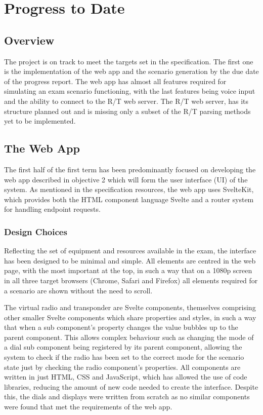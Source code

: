 \section{Progress to Date}
\label{sec:progress}

\subsection{Overview}
The project is on track to meet the targets set in the specification. The first one is the implementation of the web app and the scenario generation by the due date of the progress report. The web app has almost all features required for simulating an exam scenario functioning, with the last features being voice input and the ability to connect to the R/T web server. The R/T web server, has its structure planned out and is missing only a subset of the R/T parsing methods yet to be implemented.

\subsection{The Web App}
The first half of the first term has been predominantly focused on developing the web app described in objective 2 which will form the user interface (UI) of the system. As mentioned in the specification resources, the web app uses SvelteKit, which provides both the HTML component language Svelte and a router system for handling endpoint requests.

\subsubsection{Design Choices}
Reflecting the set of equipment and resources available in the exam, the interface has been designed to be minimal and simple. All elements are centred in the web page, with the most important at the top, in such a way that on a 1080p screen in all three target browsers (Chrome, Safari and Firefox) all elements required for a scenario are shown without the need to scroll.

The virtual radio and transponder are Svelte components, themselves comprising other smaller Svelte components which share properties and styles, in such a way that when a sub component's property changes the value bubbles up to the parent component. This allows complex behaviour such as changing the mode of a dial sub component being registered by its parent component, allowing the system to check if the radio has been set to the correct mode for the scenario state just by checking the radio component's properties. All components are written in just HTML, CSS and JavaScript, which has allowed the use of code libraries, reducing the amount of new code needed to create the interface. Despite this, the dials and displays were written from scratch as no similar components were found that met the requirements of the web app.

